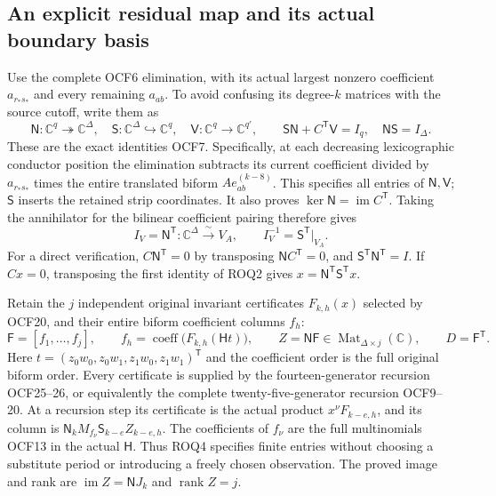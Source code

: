 \documentclass[11pt,a4paper]{article}
\begin{document}
\subsection{An explicit residual map and its actual boundary basis}

Use the complete OCF6 elimination, with its actual largest nonzero
coefficient $a_{r_*s_*}$ and every remaining $a_{ab}$. To avoid confusing
its degree-$k$ matrices with the source cutoff, write them as
\[
 \mathsf N:\mathbb C^q\twoheadrightarrow\mathbb C^\Delta,
 \quad \mathsf S:\mathbb C^\Delta\hookrightarrow\mathbb C^q,
 \quad \mathsf V:\mathbb C^q\to\mathbb C^{q'},
 \qquad
 \mathsf S\mathsf N+C^{\mathsf T}\mathsf V=I_q,
 \quad \mathsf N\mathsf S=I_\Delta.
 \tag{ROQ2}
\]
These are the exact identities OCF7. Specifically, at each decreasing
lexicographic conductor position the elimination subtracts its current
coefficient divided by $a_{r_*s_*}$ times the entire translated biform
$A e_{ab}^{(k-8)}$. This specifies all entries of $\mathsf N,\mathsf V$;
$\mathsf S$ inserts the retained strip coordinates. It also proves
$\ker\mathsf N=\operatorname{im}C^{\mathsf T}$.
Taking the annihilator for the bilinear coefficient pairing therefore gives
\[
 I_V=\mathsf N^{\mathsf T}:\mathbb C^\Delta\xrightarrow{\ \sim\ }V_A,
 \qquad I_V^{-1}=\mathsf S^{\mathsf T}|_{V_A}.
 \tag{ROQ3}
\]
For a direct verification, $C\mathsf N^{\mathsf T}=0$ by transposing
$\mathsf NC^{\mathsf T}=0$, and $\mathsf S^{\mathsf T}\mathsf N^{\mathsf T}=I$.
If $Cx=0$, transposing the first identity of ROQ2 gives
$x=\mathsf N^{\mathsf T}\mathsf S^{\mathsf T}x$.

Retain the $j$ independent original invariant certificates $F_{k,h}(x)$
selected by OCF20, and their entire biform coefficient columns $f_h$:
\[
 \mathsf F=[f_1,\ldots,f_j],\qquad
 f_h=\operatorname{coeff}\bigl(F_{k,h}(\mathsf Ht)\bigr),\qquad
 Z=\mathsf N\mathsf F\in\operatorname{Mat}_{\Delta\times j}(\mathbb C),
 \qquad D=\mathsf F^{\mathsf T}.
 \tag{ROQ4}
\]
Here $t=(z_0w_0,z_0w_1,z_1w_0,z_1w_1)^{\mathsf T}$ and the coefficient
order is the full original biform order. Every certificate is supplied
by the fourteen-generator recursion OCF25--26, or equivalently the
complete twenty-five-generator recursion OCF9--20. At a recursion step
its certificate is the actual product $x^\nu F_{k-e,h}$, and its column
is $\mathsf N_k M_{f_\nu}\mathsf S_{k-e}Z_{k-e,h}$. The coefficients
of $f_\nu$ are the full multinomials OCF13 in the actual $\mathsf H$.
Thus ROQ4 specifies finite entries without choosing a substitute period
or introducing a freely chosen observation. The proved image and rank are
$\operatorname{im}Z=\mathsf N J_k$ and $\operatorname{rank}Z=j$.
\end{document}
